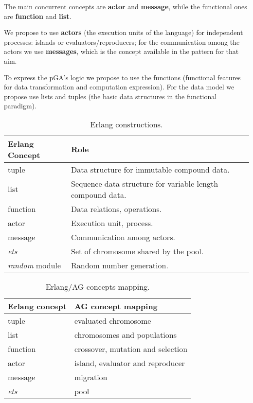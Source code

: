 
The main concurrent concepts are \textbf{actor} and \textbf{message}, while the functional ones are \textbf{function} and \textbf{list}.

We propose to use \textbf{actors} (the execution units of the language) for independent processes: islands or evaluators/reproducers; for the communication among the actors we use \textbf{messages}, which is the concept available in the pattern for that aim.

To express the pGA’s logic we propose to use the functions (functional features for data transformation and computation expression). For the data model we propose use lists and tuples (the basic data structures in the functional paradigm).


\begin{table}[h!]
  \centering
   \caption{Erlang constructions.}\label{erlConstructions}
\begin{tabular}{|>{\centering}p{2.6cm}|p{5cm}|}
  \hline
  \textbf{Erlang Concept} & \textbf{Role} \tabularnewline
     \hline
  tuple & Data structure for immutable compound data. \tabularnewline
     \hline
  list & Sequence data structure for variable length compound data. \tabularnewline
     \hline
  function & Data relations, operations. \tabularnewline
     \hline
  actor & Execution unit, process. \tabularnewline
     \hline
  message & Communication among actors. \tabularnewline
     \hline
  {\em ets} & Set of chromosome shared by the pool. \tabularnewline
     \hline
  {\em random} module& Random number generation. \tabularnewline
  \hline
\end{tabular}

\end{table}

\begin{table}
  \centering
  \caption{Erlang/AG concepts mapping.}\label{erlAGRelation}
\begin{tabular}{|>{\centering}p{2.6cm}|p{5cm}|}
  \hline
  \textbf{Erlang concept} & \textbf{AG concept mapping} \tabularnewline
     \hline
  tuple & evaluated chromosome \tabularnewline
     \hline
  list & chromosomes and populations \tabularnewline
     \hline
  function & crossover, mutation and selection \tabularnewline
     \hline
  actor  & island, evaluator and reproducer \tabularnewline
     \hline
  message & migration \tabularnewline
     \hline
  {\em ets}  & pool \tabularnewline
     \hline

\end{tabular}

\end{table}


